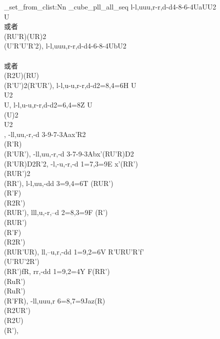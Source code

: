 \documentclass{article}
\begin{document}

\seq_set_from_clist:Nn \g_cube_pll_all_seq {
    {l-l,uuu,r-r,d-d}{4-8-6-4}{Ua}{UU2\\U\\或者\\(RU'R)(UR)2\\(U'R'U'R'2)}, %
    {l-l,uuu,r-r,d-d}{4-6-8-4}{Ub}{U2\\\\或者\\(R2U)(RU)\\(R'U')2(R'UR')}, %
    {l-l,u-u,r-r,d-d}{2=8,4=6}{H} {U\\U2\\U}, %
    {l-l,u-u,r-r,d-d}{2=6,4=8}{Z} {U\\(U)2\\U2\\}, %
    {-ll,uu,-r,-d   }{3-9-7-3}{Aa}{x'R2\\(R'R)\\(R'UR')}, %
    {-ll,uu,-r,-d   }{3-7-9-3}{Ab}{x'(RU'R)D2\\(R'UR)D2R'2}, %
    {-l,-u,-r,-d    }{1=7,3=9}{E} {x'(RR')\\(RUR')2\\(RR')}, %
    {l-l,uu,-dd     }{3=9,4=6}{T} {(RUR')\\(R'F)\\(R2R')\\(RUR')}, %
    {lll,u,-r,--d   }{2=8,3=9}{F} {(R')\\(RUR')\\(R'F)\\(R2R')\\(RUR'UR)}, %
    {ll,--u,r,-dd   }{1=9,2=6}{V} {R'URU'R'f'\\(U'RU'2R')\\(RR')fR}, %
    {rr,-dd         }{1=9,2=4}{Y} {F(RR')\\(RuR')\\(RuR')\\(R'FR)}, %
    {-ll,uuu,r      }{6=8,7=9}{Ja}{z(R)\\(R2UR')\\(R2U)\\(R')}, %
}
\end{document}
